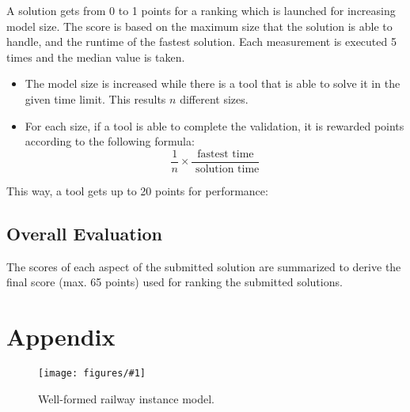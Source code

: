 \documentclass[submission,copyright,creativecommons]{eptcs}
\newcommand{\ttcfig}[2]{
\begin{figure}[htb] 
	\centering
	\texttt{[image: figures/\#1]}
	\caption{#2.}
	\label{fig:#1}
\end{figure}}
\begin{document}
A solution gets from 0 to 1 points for a ranking which is launched for increasing model size. The score is based on the maximum size that the solution is able to handle, and the runtime of the fastest solution. Each measurement is executed 5 times and the median value is taken.
\begin{itemize}
  \item The model size is increased while there is a tool that is able to solve it in the given time limit. This results $n$ different sizes.
  \item For each size, if a tool is able to complete the validation, it is rewarded points according to the following formula:
  \[ \frac{1}{n} \times \frac{\text{fastest time}}{\text{ solution time}} \]
\end{itemize}

This way, a tool gets up to 20 points for performance:

\noindent{}

\subsection{Overall Evaluation}

The scores of each aspect of the submitted solution are summarized to derive the final score (max. 65 points) used for ranking the submitted solutions.




\clearpage

\appendix
\section{Appendix}

\ttcfig{railway-yed}{Well-formed railway instance model}
\end{document}
